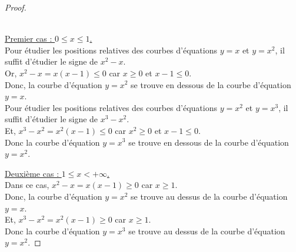\begin{proof}
~\\
~\\
\begin{minipage}[c]{0.5\linewidth}
 \underline{Premier cas : $0\leq x \leq 1$.}\\ 
Pour étudier les positions relatives des courbes d'équations $y=x$ et $y=x^2$, il suffit d'étudier le signe de $x^2-x$.\\
Or, $x^2-x=x(x-1)\leq 0$ car $x\geq 0$ et $x-1\leq 0$.
\\Donc, la courbe d'équation $y=x^2$ se trouve en dessous de la courbe d'équation $y=x$.\\
Pour étudier les positions relatives des courbes d'équations $y=x^2$ et $y=x^3$, il suffit d'étudier le signe de $x^3-x^2$.\\
Et, $x^3-x^2=x^2(x-1)\leq 0$ car $x^2\geq 0$ et $x-1\leq 0$. \\
Donc la courbe d'équation $y=x^3$ se trouve en dessous de la courbe d'équation $y=x^2$.

\end{minipage} \hfill
\begin{minipage}[c]{0.4\linewidth}
 \underline{Deuxième cas : $1\leq x <+\infty$.}\\
Dans ce cas, $x^2-x=x(x-1)\geq 0$ car $x\geq 1$.
\\Donc, la courbe d'équation $y=x^2$ se trouve au dessus de la courbe d'équation $y=x$.\\
Et, $x^3-x^2=x^2(x-1)\geq 0$ car $x \geq 1$. \\
Donc la courbe d'équation $y=x^3$ se trouve au dessus de la courbe d'équation $y=x^2$.
\end{minipage}
\end{proof}

\bigskip

\newpage

